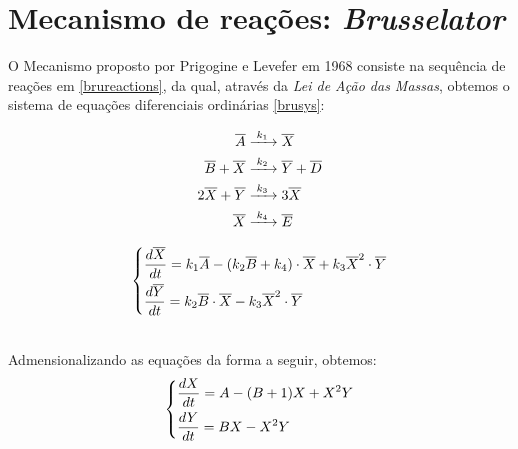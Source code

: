 \section{\textbf{Mecanismo de reações: \textit{Brusselator}}}
O Mecanismo proposto por Prigogine e Levefer em 1968 consiste na sequência de reações em \ref{brureactions}, da qual, através da \textit{Lei de Ação das Massas}, obtemos o sistema de equações diferenciais ordinárias \ref{brusys}:\\
\begin{minipage}{.48\textwidth}
\vspace{-3ex}
\begin{align}
\hspace{-10pt}
\centering
\overline{A}&\ce{->T[\ce{$k_1$}]}\overline{X} \nonumber\\
\overline{B}+\overline{X}&\ce{->T[\ce{$k_2$}]}\overline{Y}+\overline{D} \nonumber\\
2\overline{X}+\overline{Y}&\ce{->T[\ce{$k_3$}]}3\overline{X} \nonumber\\
\overline{X}&\ce{->T[\ce{$k_4$}]}\overline{E} 
\label{brureactions}
\end{align}
\end{minipage}
\begin{minipage}{.04\textwidth}
\vspace{-3ex}
\end{minipage}
\begin{minipage}{.48\textwidth}
\vspace{-3ex}
\begin{equation}
\centering
    \begin{dcases}
      \frac{d\overline{X}}{dt}=k_{1}\overline{A}-(k_{2}\overline{B}+k_{4})\cdot\overline{X}+k_{3}\overline{X}^2\cdot\overline{Y}\\
      \frac{d\overline{Y}}{dt}=k_{2}\overline{B}\cdot\overline{X}-k_{3}\overline{X}^2\cdot\overline{Y}\\
    \end{dcases}
\label{brusys}
\end{equation}
\end{minipage}
\\[2ex]
Admensionalizando as equações da forma a seguir, obtemos:
\begin{equation*}
\centering
    \begin{dcases}
      \frac{dX}{dt}=A-(B+1)X+X^2Y\\
      \frac{dY}{dt}=BX-X^2Y\\
    \end{dcases}
\end{equation*}

